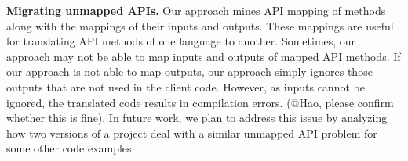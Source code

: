 \textbf{Migrating unmapped APIs.} Our approach mines API mapping of
methods along with the mappings of their inputs and outputs.
These mappings are useful for translating API methods of one language to another.
Sometimes, our approach may not be able to map inputs and outputs 
of mapped API methods. If our approach is not able to map outputs,
our approach simply ignores those outputs that are not used in the client code.
However, as inputs cannot be ignored, the translated code results in compilation errors.
(@Hao, please confirm whether this is fine). In future work, we plan to address
this issue by analyzing how two versions of a project deal 
with a similar unmapped API problem for some other code examples.